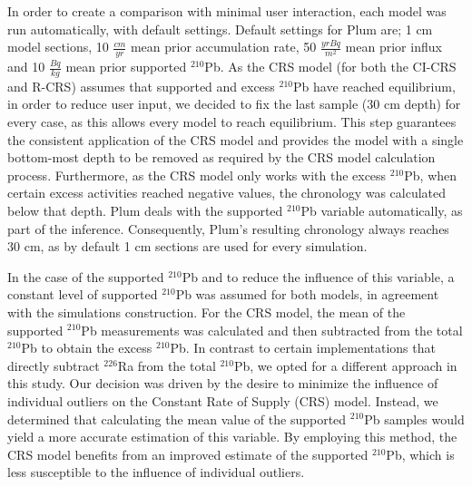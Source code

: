 \documentclass [10pt] {article}
\begin{document}
In order to create a comparison with minimal user interaction, each model was run automatically, with default settings.
Default settings for Plum are; 1 cm model sections, 10 $\frac{cm}{yr}$ mean prior accumulation rate, 50 $\frac{yr Bq}{m^2}$ mean prior influx and 10 $\frac{Bq}{kg}$ mean prior supported $^{210}$Pb.
As the CRS model (for both the CI-CRS and R-CRS) assumes that supported and excess $^{210}$Pb have reached equilibrium, in order to reduce user input, we decided to fix the last sample (30 cm depth) for every case, as this allows every model to reach equilibrium. This step guarantees the consistent application of the CRS model and provides the model with a single bottom-most depth to be removed as required by the CRS model calculation process. 
Furthermore, as the CRS model only works with the excess $^{210}$Pb, when certain excess activities reached negative values, the chronology was calculated below that depth.
Plum deals with the supported $^{210}$Pb variable automatically, as part of the inference.
Consequently, Plum's resulting chronology always reaches 30 cm, as by default 1 cm sections are used for every simulation.

In the case of the supported $^{210}$Pb and to reduce the influence of this variable, %
a constant level of supported $^{210}$Pb was assumed for both models, in agreement with the simulations construction. %
For the CRS model, the mean of the supported $^{210}$Pb measurements was calculated and then subtracted from the total $^{210}$Pb to obtain the excess $^{210}$Pb.
In contrast to certain implementations that directly subtract $^{226}$Ra from the total $^{210}$Pb, we opted for a different approach in this study. Our decision was driven by the desire to minimize the influence of individual outliers on the Constant Rate of Supply (CRS) model. Instead, we determined that calculating the mean value of the supported $^{210}$Pb samples would yield a more accurate estimation of this variable. By employing this method, the CRS model benefits from an improved estimate of the supported $^{210}$Pb, which is less susceptible to the influence of individual outliers.

\end{document}
